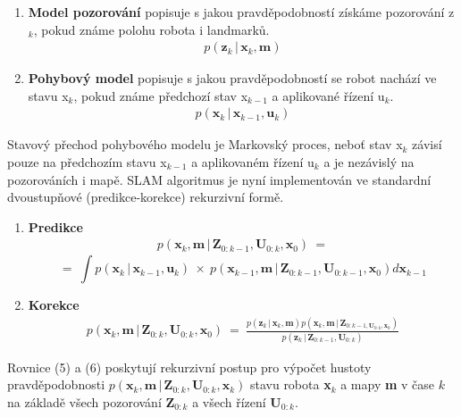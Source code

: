 \documentclass[12pt,a4paper]{report}
\begin{document}
\begin{enumerate}
\item \textbf{Model pozorování} popisuje s jakou pravděpodobností získáme pozorování z$_k$, pokud známe polohu robota i landmarků.
\begin{eqnarray}
p(\textbf{z}_k \,|\, \textbf{x}_k, \textbf{m})
\end{eqnarray}
\item \textbf{Pohybový model} popisuje s jakou pravděpodobností se robot nachází ve stavu x$_k$, pokud známe předchozí stav x$_{k-1}$ a aplikované řízení u$_k$.
\begin{eqnarray}
p(\textbf{x}_k \,|\, \textbf{x}_{k-1}, \textbf{u}_k)
\end{eqnarray}
\end{enumerate}

Stavový přechod pohybového modelu je Markovský proces, neboť stav x$_k$ závisí pouze na předchozím stavu x$_{k-1}$ a aplikovaném řízení u$_k$ a je nezávislý na pozorováních i mapě. SLAM algoritmus je nyní implementován ve standardní dvoustupňové (predikce-korekce) rekurzivní formě.

\begin{enumerate}
\item \textbf{Predikce} 
\begin{eqnarray}
p(\textbf{x}_k, \textbf{m} \,|\, \textbf{Z}_{0:k-1}, \textbf{U}_{0:k}, \textbf{x}_0) \: = 
\end{eqnarray}
$$
= \: \int p(\textbf{x}_k \,|\, \textbf{x}_{k-1}, \textbf{u}_k) \: \times \: p(\textbf{x}_{k-1}, \textbf{m} \,|\, \textbf{Z}_{0:k-1}, \textbf{U}_{0:k-1}, \textbf{x}_0) d\textbf{x}_{k-1}  
$$
\item \textbf{Korekce}
\begin{eqnarray}
p(\textbf{x}_k, \textbf{m} \,|\, \textbf{Z}_{0:k}, \textbf{U}_{0:k}, \textbf{x}_0) \: = \: \frac{p(\textbf{z}_k \,|\, \textbf{x}_k, \textbf{m}) p(\textbf{x}_k, \textbf{m} \,|\, \textbf{Z}_{0:k-1, \textbf{U}_{0:k}, \textbf{x}_0})}{p(\textbf{z}_k \,|\, \textbf{Z}_{0:k-1}, \textbf{U}_{0:k})}
\end{eqnarray}
\end{enumerate}

Rovnice (5) a (6) poskytují rekurzivní postup pro výpočet hustoty pravděpodobnosti $p(\textbf{x}_k, \textbf{m} \,|\, \textbf{Z}_{0:k}, \textbf{U}_{0:k}, \textbf{x}_k)$ stavu robota \textbf{x}$_k$ a mapy \textbf{m} v čase $k$ na základě všech pozorování \textbf{Z}$_{0:k}$ a všech řízení \textbf{U}$_{0:k}$.
\end{document}
